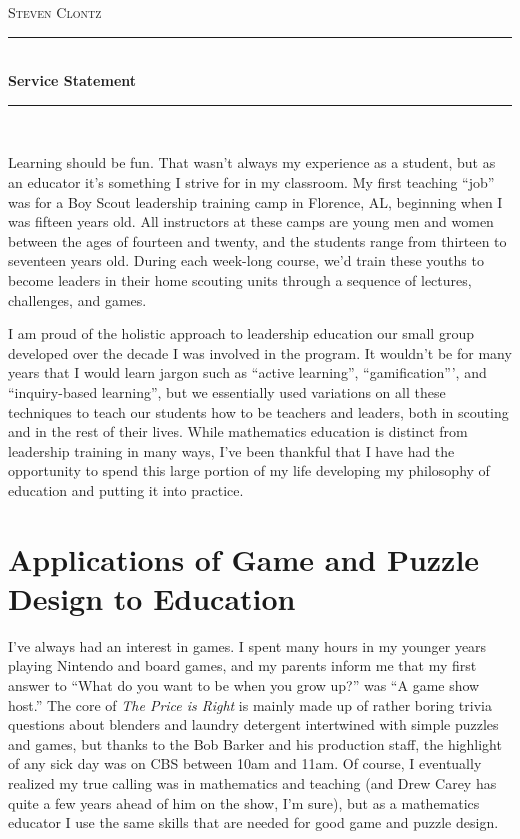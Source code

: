 \documentclass[11pt]{amsart}
\theoremstyle{plain}
\newcommand{\HRule}{\rule{\linewidth}{0.5mm}}
\newcommand{\<}{\langle}
\renewcommand{\>}{\rangle}
\begin{document}
\begin{center}

\textsc{\huge Steven Clontz}

\HRule \\[0.1cm]
{ \huge \bfseries Service Statement \\[0.4cm] }

\HRule \\[1.5cm]

\end{center}

Learning should be fun. That wasn't always my experience as a student, but
as an educator it's something I strive for in my classroom.
My first teaching ``job'' was
for a Boy Scout leadership training camp in Florence, AL, beginning when I was
fifteen years old. All instructors at these camps are young men and women
between the ages of fourteen and twenty, and the students range from thirteen to
seventeen years old. During each week-long course, we'd train these youths to
become leaders in their home scouting units through a sequence of lectures,
challenges, and games.

I am proud of the holistic approach to leadership education our small
group developed over the decade I was involved in the program. It wouldn't be
for many years that I would learn jargon such as ``active learning'',
``gamification''', and ``inquiry-based learning'', but we essentially used
variations on all these techniques to teach our students how to be teachers
and leaders, both in scouting and in the rest of their lives.
While mathematics education is distinct from leadership training in many ways,
I've been thankful that I have had the opportunity to spend this large portion
of my life developing my philosophy of education and putting it into practice.


\section*{Applications of Game and Puzzle Design to Education}

I've always had an interest in games. I spent many hours in my younger years
playing Nintendo and board games, and my parents inform me that my first
answer to ``What do you want to be when you grow up?'' was ``A game show host.''
The core of \textit{The Price is Right} is mainly made up of
rather boring trivia questions about blenders and laundry detergent
intertwined with simple puzzles and games, but
thanks to the Bob Barker and his production staff, the highlight of any
sick day was on CBS between 10am and 11am.
Of course, I eventually realized my true calling was in mathematics and
teaching (and Drew Carey has quite a few years ahead of him on the show,
I'm sure), but as a mathematics educator I use the same skills that
are needed for good game and puzzle design.
\end{document}
